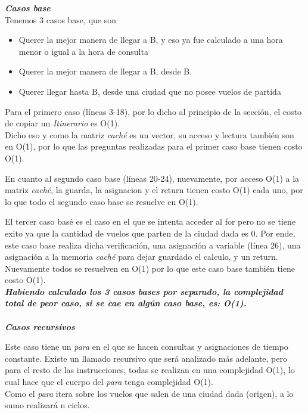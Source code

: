 \documentclass[10pt,a4paper]{article}
\begin{document}
\textbf{\textit{Casos base}}\\
Tenemos 3 casos base, que son
\begin{itemize}
\item Querer la mejor manera de llegar a B, y eso ya fue calculado a una hora menor o igual a la hora de consulta
\item Querer la mejor manera de llegar a B, desde B. 
\item Querer llegar hasta B, desde una ciudad que no posee vuelos de partida\\
\end{itemize}

Para el primero caso (líneas 3-18), por lo dicho al principio de la sección, el costo de copiar un \textit{Itinerario} es O(1).\\ Dicho eso y como la matriz \textit{caché} es un vector, su acceso y lectura también son en O(1), por lo que las preguntas realizadas para el primer caso base tienen costo O(1).

En cuanto al segundo caso base (líneas 20-24), nuevamente, por acceso O(1) a la matriz \textit{caché}, la guarda, la asignacion y el return tienen costo O(1) cada uno, por lo que todo el segundo caso base se resuelve en O(1).

El tercer caso basé es el caso en el que se intenta acceder al for pero no se tiene exito ya que la cantidad de vuelos que parten de la ciudad dada es 0. Por ende, este caso base realiza dicha verificación, una asignación a variable (línea 26), una asignación a la memoria \textit{caché} para dejar guardado el calculo, y un return. Nuevamente todos se resuelven en O(1) por lo que este caso base también tiene costo O(1).\\

\textbf{\textit{Habiendo calculado los 3 casos bases por separado, la complejidad total de peor caso, si se cae en algún caso base, es: O(1).}}\\ \\

\textbf{\textit{Casos recursivos}}

Este caso tiene un \textit{para} en el que se hacen consultas y asignaciones de tiempo constante. Existe un llamado recursivo que será analizado más adelante, pero para el resto de las instrucciones, todas se realizan en una complejidad O(1), lo cual hace que el cuerpo del \textit{para} tenga complejidad O(1).\\
Como el \textit{para} itera sobre los vuelos que salen de una ciudad dada (origen), a lo sumo realizará n ciclos.
\end{document}
